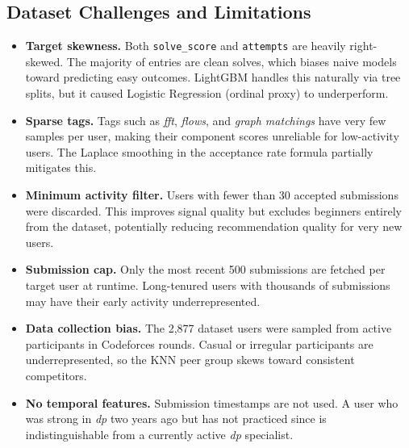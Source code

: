 \documentclass[12pt,a4paper]{article}
\begin{document}
\subsection*{Dataset Challenges and Limitations}

\begin{itemize}
    \item \textbf{Target skewness.} Both \texttt{solve\_score} and
          \texttt{attempts} are heavily right-skewed. The majority of entries
          are clean solves, which biases naive models toward predicting easy
          outcomes. LightGBM handles this naturally via tree splits, but it
          caused Logistic Regression (ordinal proxy) to underperform.

    \item \textbf{Sparse tags.} Tags such as \textit{fft}, \textit{flows}, and
          \textit{graph matchings} have very few samples per user, making
          their component scores unreliable for low-activity users. The
          Laplace smoothing in the acceptance rate formula partially mitigates
          this.

    \item \textbf{Minimum activity filter.} Users with fewer than 30 accepted
          submissions were discarded. This improves signal quality but
          excludes beginners entirely from the dataset, potentially reducing
          recommendation quality for very new users.

    \item \textbf{Submission cap.} Only the most recent 500 submissions are
          fetched per target user at runtime. Long-tenured users with
          thousands of submissions may have their early activity
          underrepresented.

    \item \textbf{Data collection bias.} The 2,877 dataset users were sampled
          from active participants in Codeforces rounds. Casual or irregular
          participants are underrepresented, so the KNN peer group skews
          toward consistent competitors.

    \item \textbf{No temporal features.} Submission timestamps are not used.
          A user who was strong in \textit{dp} two years ago but has not
          practiced since is indistinguishable from a currently active
          \textit{dp} specialist.
\end{itemize}


\end{document}
